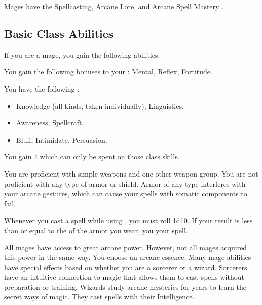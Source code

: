      Mages have the Spellcasting, Arcane Lore, and Arcane Spell Mastery .

    \subsection{Basic Class Abilities}
        If you are a mage, you gain the following abilities.

        You gain the following bonuses to your :  Mental,  Reflex,  Fortitude.

        You have the following :
        \begin{itemize}
            \item {} Knowledge (all kinds, taken individually), Linguistics.
            \item {} Awareness, Spellcraft.
            \item {} Bluff, Intimidate, Persuasion.
        \end{itemize}
        You gain 4  which can only be spent on those class skills.

        You are proficient with simple weapons and one other weapon group.
        You are not proficient with any type of armor or shield.
        Armor of any type interferes with your arcane gestures, which can cause your spells with somatic components to fail.

        Whenever you cast a spell while using , you must roll 1d10.
        If your result is less than or equal to the  of the armor you wear, you  your spell.

        All mages have access to great arcane power.
        However, not all mages acquired this power in the same way.
        You choose an arcane essence.
        Many mage abilities have special effects based on whether you are a sorcerer or a wizard.
         Sorcerers have an intuitive connection to magic that allows them to cast spells without preparation or training.
         Wizards study arcane mysteries for years to learn the secret ways of magic.
        They cast spells with their Intelligence.

